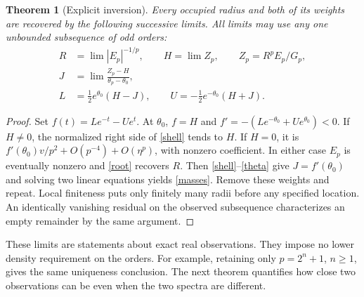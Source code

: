 \documentclass[11pt,letterpaper]{article}
\newtheorem{theorem}{Theorem}
\numberwithin{equation}{section}
\begin{document}
\begin{theorem}[Explicit inversion]\label{inverse}
Every occupied radius and both of its weights are recovered by the following
successive limits. All limits may use any one unbounded subsequence of odd orders:
\begin{align}
 R&=\lim |E_p|^{-1/p},\qquad H=\lim Z_p,\qquad Z_p=R^p E_p/G_p,\label{root}\\
 J&=\lim\frac{Z_p-H}{\theta_p-\theta_0},\label{slope}\\
 L&=\tfrac12 e^{\theta_0}(H-J),\qquad
 U=-\tfrac12 e^{-\theta_0}(H+J).\label{masses}
\end{align}
\end{theorem}
\begin{proof}
Set $f(t)=L e^{-t}-Ue^t$. At $\theta_0$, $f=H$ and
$f'=-(L e^{-\theta_0}+Ue^{\theta_0})<0$. If $H\ne0$, the normalized
right side of \eqref{shell} tends to $H$. If $H=0$, it is
$f'(\theta_0)v/p^2+O(p^{-4})+O(\eta^p)$, with nonzero coefficient.
In either case $E_p$ is eventually nonzero and \eqref{root} recovers $R$.
Then \eqref{shell}--\eqref{theta} give $J=f'(\theta_0)$ and solving two
linear equations yields \eqref{masses}. Remove these weights and repeat.
Local finiteness puts only finitely many radii before any specified
location. An identically vanishing residual on the observed subsequence
characterizes an empty remainder by the same argument.
\end{proof}

These limits are statements about exact real observations. They impose no
lower density requirement on the orders. For example, retaining only
$p=2^n+1$, $n\ge1$, gives the same uniqueness conclusion. The next theorem
quantifies how close two observations can be even when the two spectra
are different.
\newpage
\end{document}

